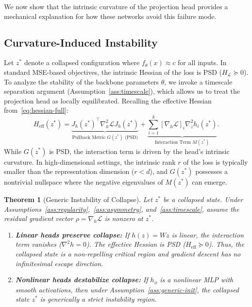 \documentclass{article}
\theoremstyle{plain}
\newtheorem{theorem}{Theorem}[section]
\theoremstyle{definition}
\theoremstyle{remark}
\begin{document}
We now show that the intrinsic curvature of the projection head provides a mechanical explanation for how these networks avoid this failure mode.

\subsection{Curvature-Induced Instability}

Let $z^*$ denote a collapsed configuration where $f_\theta(x) \approx c$ for all inputs. In standard MSE-based objectives, the intrinsic Hessian of the loss is PSD ($H_{\mathcal{L}} \succeq 0$). To analyze the stability of the backbone parameters $\theta$, we invoke a timescale separation argument (Assumption~\ref{ass:timescale}), which allows us to treat the projection head as locally equilibrated. Recalling the effective Hessian from~\eqref{eq:hessian-full}:
\begin{equation*}
    H_{\text{eff}}(z^*) = \underbrace{J_h(z^*)^\top \nabla_h^2 \mathcal{L} J_h(z^*)}_{\text{Pullback Metric } G(z^*) \text{ (PSD)}} + \underbrace{\sum_{i=1}^k [\nabla_h \mathcal{L}]_i \nabla_z^2  h_i(z^*)}_{\text{Interaction Term } M(z^*)}.
\end{equation*}
While $G(z^*)$ is PSD, the interaction term is driven by the head's intrinsic curvature. In high-dimensional settings, the intrinsic rank $r$ of the loss is typically smaller than the representation dimension ($r < d$), and $G(z^*)$ possesses a nontrivial nullspace where the negative eigenvalues of $M(z^*)$ can emerge.

\begin{theorem}[Generic Instability of Collapse]
\label{thm:instability}
Let $z^*$ be a collapsed state. Under Assumptions~\ref{ass:regularity},~\ref{ass:asymmetry}, and~\ref{ass:timescale}, assume the residual gradient vector $\rho = \nabla_h \mathcal{L}$ is nonzero at $z^*$.
\begin{enumerate}
    \item \textbf{Linear heads preserve collapse:} If $h(z) = Wz$ is linear, the interaction term vanishes ($\nabla^2 h = 0$). The effective Hessian is PSD ($H_{\text{eff}} \succeq 0$). Thus, the collapsed state is a non-repelling critical region and gradient descent has no infinitesimal escape direction.
    
    \item \textbf{Nonlinear heads destabilize collapse:} If $h_\phi$ is a nonlinear MLP with smooth activations, then under Assumption~\ref{ass:generic-init}, the collapsed state $z^*$ is generically a strict instability region.
\end{enumerate}
\end{theorem}
\end{document}

